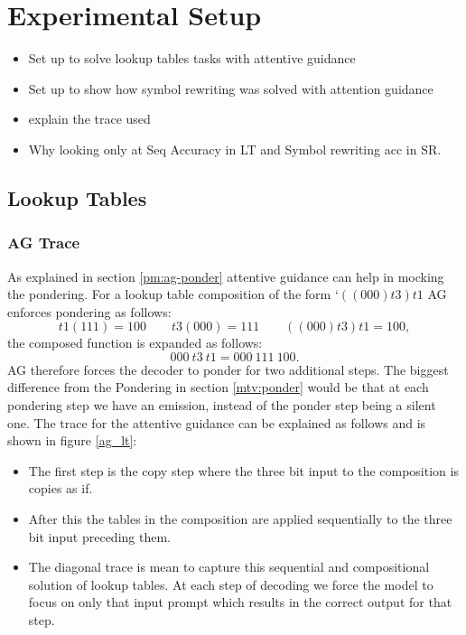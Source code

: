 \chapter{Experimental Setup}\label{Chapter:experiments}
\begin{itemize}
	\item Set up to solve lookup tables tasks with attentive guidance
	\item Set up to show how symbol rewriting was solved with attention guidance
	\item explain the trace used
	\item Why looking only at Seq Accuracy in LT and Symbol rewriting acc in SR.
\end{itemize}

\section{Lookup Tables} \label{exp:lt}

\subsection{AG Trace}
As explained in section \ref{pm:ag-ponder} attentive guidance can help in mocking the pondering. For a lookup table composition of the form \lq $((000)t3)t1$ AG enforces pondering as follows:
\begin{equation}
t1(111) = 100 \qquad t3(000) = 111 \qquad ((000)t3)t1 = 100,
\end{equation}
the composed function is expanded as follows:
\begin{equation}
000\ t3\ t1 = 000\ 111\ 100.
\end{equation}
AG therefore forces the decoder to ponder for two additional steps. The biggest difference from the Pondering in section \ref{mtv:ponder} would be that at each pondering step we have an emission, instead of the ponder step being a silent one. The trace for the attentive guidance can be explained as follows and is shown in figure \ref{ag_lt}:
\begin{itemize}
	\item The first step is the copy step where the three bit input to the composition is copies as if.
	\item After this the tables in the composition are applied sequentially to the three bit input preceding them.
	\item The diagonal trace is mean to capture this sequential and compositional solution of lookup tables. At each step of decoding we force the model to focus on only that input prompt which results in the correct output for that step.
\end{itemize}


